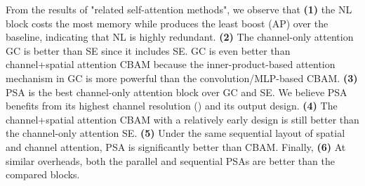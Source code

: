 \documentclass[10pt,twocolumn,letterpaper]{article}
\begin{document}
From the results of "related self-attention methods", we observe that \textbf{(1)} the NL block costs the most memory while produces the least boost (AP) over the baseline, indicating that NL is highly redundant. \textbf{(2)} The channel-only attention GC is better than SE since it includes SE. GC is even better than channel+spatial attention CBAM because the inner-product-based attention mechanism in GC is more powerful than the convolution/MLP-based CBAM. \textbf{(3)} PSA  is the best channel-only attention block over GC and SE. We believe PSA benefits from its highest channel resolution () and its output design. \textbf{(4)} The channel+spatial attention CBAM with a relatively early design is still better than the channel-only attention SE. \textbf{(5)} Under the same sequential layout of spatial and channel attention, PSA is significantly better than CBAM. Finally, \textbf{(6)} At similar overheads, both the parallel and sequential PSAs are better than the compared blocks.
\end{document}
